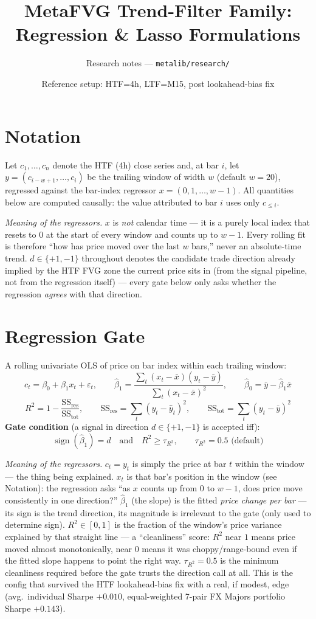 \documentclass[11pt]{article}
\title{\vspace{-1.5em}MetaFVG Trend-Filter Family: Regression \& Lasso Formulations}
\author{Research notes --- \texttt{metalib/research/}}
\date{Reference setup: HTF=4h, LTF=M15, post lookahead-bias fix}
\newcommand{\meaningpar}[1]{\par\noindent\textit{Meaning of the regressors.} #1}
\begin{document}
\maketitle
\vspace{-2em}

\section*{Notation}
Let $c_1,\dots,c_n$ denote the HTF (4h) close series and, at bar $i$, let $y = (c_{i-w+1},\dots,c_i)$
be the trailing window of width $w$ (default $w=20$), regressed against the bar-index
regressor $x = (0,1,\dots,w-1)$. All quantities below are computed causally: the value
attributed to bar $i$ uses only $c_{\le i}$.
\meaningpar{$x$ is \emph{not} calendar time --- it is a purely local index that resets to
$0$ at the start of every window and counts up to $w-1$. Every rolling fit is therefore
``how has price moved over the last $w$ bars,'' never an absolute-time trend. $d\in\{+1,-1\}$
throughout denotes the candidate trade direction already implied by the HTF FVG zone the
current price sits in (from the signal pipeline, not from the regression itself) --- every
gate below only asks whether the regression \emph{agrees} with that direction.}

\section{Regression Gate}
A rolling univariate OLS of price on bar index within each trailing window:
\[
c_t = \beta_0 + \beta_1 x_t + \varepsilon_t, \qquad
\hat\beta_1 = \frac{\sum_t (x_t-\bar x)(y_t-\bar y)}{\sum_t (x_t-\bar x)^2}, \qquad
\hat\beta_0 = \bar y - \hat\beta_1 \bar x
\]
\[
R^2 = 1 - \frac{\mathrm{SS}_{\mathrm{res}}}{\mathrm{SS}_{\mathrm{tot}}}, \qquad
\mathrm{SS}_{\mathrm{res}} = \sum_t (y_t - \hat y_t)^2, \qquad
\mathrm{SS}_{\mathrm{tot}} = \sum_t (y_t - \bar y)^2
\]
\textbf{Gate condition} (a signal in direction $d\in\{+1,-1\}$ is accepted iff):
\[
\operatorname{sign}(\hat\beta_1) = d \quad \text{and} \quad R^2 \ge \tau_{R^2}, \qquad \tau_{R^2}=0.5 \text{ (default)}
\]
\meaningpar{$c_t=y_t$ is simply the price at bar $t$ within the window --- the thing being explained.
$x_t$ is that bar's position in the window (see Notation): the regression asks ``as $x$ counts
up from $0$ to $w-1$, does price move consistently in one direction?'' $\hat\beta_1$ (the slope) is
the fitted \emph{price change per bar} --- its sign is the trend direction, its magnitude is
irrelevant to the gate (only used to determine sign). $R^2\in[0,1]$ is the fraction of the window's
price variance explained by that straight line --- a ``cleanliness'' score: $R^2$ near $1$ means
price moved almost monotonically, near $0$ means it was choppy/range-bound even if the fitted
slope happens to point the right way. $\tau_{R^2}=0.5$ is the minimum cleanliness required before
the gate trusts the direction call at all. This is the config that survived the HTF lookahead-bias
fix with a real, if modest, edge (avg.\ individual Sharpe $+0.010$, equal-weighted 7-pair FX
Majors portfolio Sharpe $+0.143$).}
\end{document}
